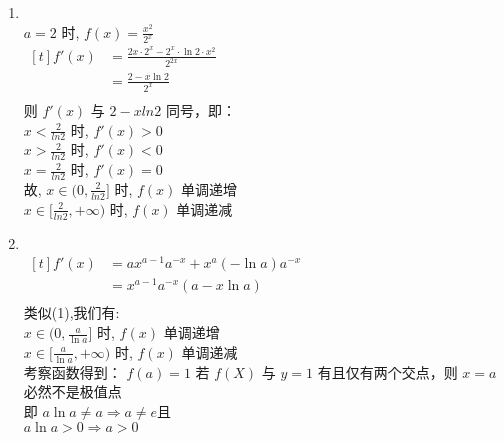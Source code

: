 \documentclass[class=ctexart,crop=false]{standalone}
\begin{document}
\begin{enumerate}[label=(\arabic*)]
	\item \quad\\
	      $a=2$ 时, $f(x)=\frac{x^2}{2^x}$\\
	      $\begin{aligned}[t]
			      f'(x) & =\frac{2x \cdot2^x-2^x\cdot \ln{2}\cdot x^2}{2^{2x}} \\
			            & =\frac{2-x\ln{2}}{2^{x}}                             \\
		      \end{aligned}$\\
	      则 $f'(x)$ 与 $2-xln2$ 同号，即：\\
	      $x<\frac{2}{ln2}$ 时, $f'(x)>0$\\
	      $x>\frac{2}{ln2}$ 时, $f'(x)<0$\\
	      $x=\frac{2}{ln2}$ 时, $f'(x)=0$\\
	      故, $x \in (0,\frac{2}{ln2}]$ 时, $f(x)$ 单调递增\\
	      $x \in [\frac{2}{ln2},+\infty)$ 时, $f(x)$ 单调递减\\
	\item \quad\\
	      $\begin{aligned}[t]
			      f'(x) & =ax^{a-1}a^{-x}+x^a(-\ln{a})a^{-x} \\
			            & =x^{a-1}a^{-x}(a-x\ln{a})          \\
		      \end{aligned}$\\
	      类似(1),我们有:\\
	      $x \in (0,\frac{a}{\ln{a}}]$ 时, $f(x)$ 单调递增\\
	      $x \in [\frac{a}{\ln{a}},+\infty)$ 时, $f(x)$ 单调递减\\
	      考察函数得到： $f(a)=1$
	      若 $f(X)$ 与 $y=1$ 有且仅有两个交点，则 $x=a$ 必然不是极值点\\
	      即 $a\ln{a} \neq a \Rightarrow a \neq e$且\\
	      $a\ln{a}>0 \Rightarrow a>0$\\
\end{enumerate}
\end{document}
